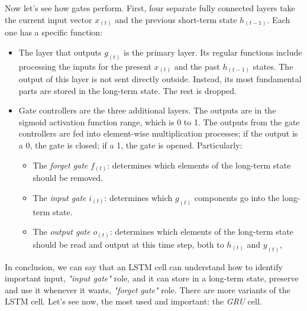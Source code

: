 Now let's see how gates perform. First, four separate fully connected layers take the current input vector $x_{(t)}$ and the previous short-term state $h_{(t-1)}$. Each one has a specific function:
\begin{itemize}
    \item The layer that outputs $g_{(t)}$ is the primary layer. Its regular functions include processing the inputs for the present $x_{(t)}$ and the past $h_{(t-1)}$ states. The output of this layer is not sent directly outside. Instead, its most fundamental parts are stored in the long-term state. The rest is dropped.
    \item Gate controllers are the three additional layers. The outputs are in the sigmoid activation function range, which is 0 to 1. The outputs from the gate controllers are fed into element-wise multiplication processes; if the output is a 0, the gate is closed; if a 1, the gate is opened. Particularly:
    \begin{itemize}
        \item The \textit{forget gate} $f_{(t)}$: determines which elements of the long-term state should be removed.
        \item The \textit{input gate} $i_{(t)}$: determines which $g_{(t)}$ components go into the long-term state.
        \item The \textit{output gate} $o_{(t)}$: determines which elements of the long-term state should be read and output at this time step, both to $h_{(t)}$ and $y_{(t)}$, 
    \end{itemize}
\end{itemize}

In conclusion, we can say that an LSTM cell can understand how to identify important input, \textit{"input gate"} role, and it can store in a long-term state, preserve and use it whenever it wants, \textit{"forget gate"} role.
There are more variants of the LSTM cell. Let's see now, the most used and important: the \textit{GRU} cell.

